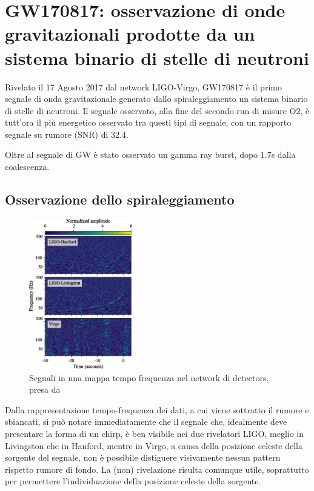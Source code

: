 \chapter[Osservazione di GW da BNS]{GW170817: osservazione di onde gravitazionali prodotte da un sistema binario di stelle di neutroni}
\label{chapter:gw170817}
Rivelato il 17 Agosto 2017 dal network LIGO-Virgo, GW170817 è il primo segnale di onda gravitazionale generato dallo spiraleggiamento un sistema binario di stelle di neutroni.
Il segnale osservato, alla fine del secondo run di misure O2, è tutt'ora il più energetico osservato tra questi tipi di segnale, con un rapporto segnale su rumore (SNR) di 32.4.

Oltre al segnale di GW è stato osservato un gamma ray burst, dopo 1.7s dalla coalescenza.
\section{Osservazione dello spiraleggiamento}
\label{section:osservazioneInspiralGW170817}
\begin{figure}
	\vspace{-15pt}
	\begin{center}
		\includegraphics[width=0.4\textwidth]{figures/Capitolo_2/gw170817_time_freq.png}
	\end{center}
	\vspace{-5pt}
	\caption{Segnali in una mappa tempo frequenza nel network di detectors, presa da \cite{Abbott_2017a}}
	\label{fig:osservazione_gw170817}
	\vspace{-40pt}
\end{figure}
Dalla rappresentazione tempo-frequenza dei dati, a cui viene sottratto il rumore e sbiancati, si può notare immediatamente che il segnale che, idealmente deve presentare la forma di un chirp, è ben visibile nei due rivelatori LIGO, meglio in Livingston che in Hanford, mentre in Virgo, a causa della posizione celeste della sorgente del segnale, non è possibile distiguere visivamente nessun pattern rispetto rumore di fondo. La (non) rivelazione risulta comunque utile, soprattutto per permettere l'individuazione della posizione celeste della sorgente.

